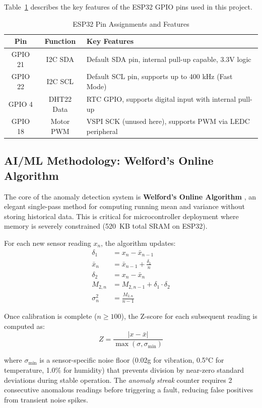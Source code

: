\documentclass[conference]{IEEEtran}
\begin{document}
Table~\ref{tab:pins} describes the key features of the ESP32 GPIO pins used in this project.

\begin{table}[H]
\centering
\caption{ESP32 Pin Assignments and Features}
\label{tab:pins}
\begin{tabular}{|c|c|p{4cm}|}
\hline
\textbf{Pin} & \textbf{Function} & \textbf{Key Features} \\
\hline
GPIO 21 & I2C SDA & Default SDA pin, internal pull-up capable, 3.3V logic \\
\hline
GPIO 22 & I2C SCL & Default SCL pin, supports up to 400 kHz (Fast Mode) \\
\hline
GPIO 4 & DHT22 Data & RTC GPIO, supports digital input with internal pull-up \\
\hline
GPIO 18 & Motor PWM & VSPI SCK (unused here), supports PWM via LEDC peripheral \\
\hline
\end{tabular}
\end{table}

\subsection{AI/ML Methodology: Welford's Online Algorithm}

The core of the anomaly detection system is \textbf{Welford's Online Algorithm} \cite{welford1962}, an elegant single-pass method for computing running mean and variance without storing historical data. This is critical for microcontroller deployment where memory is severely constrained (520~KB total SRAM on ESP32).

For each new sensor reading $x_n$, the algorithm updates:
\begin{align}
\delta_1 &= x_n - \bar{x}_{n-1} \\
\bar{x}_n &= \bar{x}_{n-1} + \frac{\delta_1}{n} \\
\delta_2 &= x_n - \bar{x}_n \\
M_{2,n} &= M_{2,n-1} + \delta_1 \cdot \delta_2 \\
\sigma^2_n &= \frac{M_{2,n}}{n - 1}
\end{align}

Once calibration is complete ($n \geq 100$), the Z-score for each subsequent reading is computed as:
\begin{equation}
Z = \frac{|x - \bar{x}|}{\max(\sigma, \sigma_{\min})}
\end{equation}

where $\sigma_{\min}$ is a sensor-specific noise floor (0.02g for vibration, 0.5°C for temperature, 1.0\% for humidity) that prevents division by near-zero standard deviations during stable operation. The \textit{anomaly streak} counter requires 2 consecutive anomalous readings before triggering a fault, reducing false positives from transient noise spikes.
\end{document}
